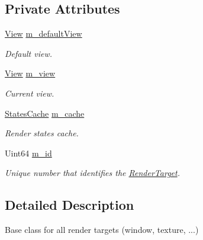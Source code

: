 \subsection*{Private Attributes}
\begin{DoxyCompactItemize}
\item 
\mbox{\label{classsf_1_1_render_target_ada0c3aefe9963dc780ac4fd32287c97e}} 
\mbox{\hyperlink{classsf_1_1_view}{View}} \mbox{\hyperlink{classsf_1_1_render_target_ada0c3aefe9963dc780ac4fd32287c97e}{m\+\_\+default\+View}}
\begin{DoxyCompactList}\small\item\em Default view. \end{DoxyCompactList}\item 
\mbox{\label{classsf_1_1_render_target_a141bf3439a6031b1c767ce1fadb81b53}} 
\mbox{\hyperlink{classsf_1_1_view}{View}} \mbox{\hyperlink{classsf_1_1_render_target_a141bf3439a6031b1c767ce1fadb81b53}{m\+\_\+view}}
\begin{DoxyCompactList}\small\item\em Current view. \end{DoxyCompactList}\item 
\mbox{\label{classsf_1_1_render_target_a56e47f258d99513328806b5a3482c933}} 
\mbox{\hyperlink{structsf_1_1_render_target_1_1_states_cache}{States\+Cache}} \mbox{\hyperlink{classsf_1_1_render_target_a56e47f258d99513328806b5a3482c933}{m\+\_\+cache}}
\begin{DoxyCompactList}\small\item\em Render states cache. \end{DoxyCompactList}\item 
\mbox{\label{classsf_1_1_render_target_a1ac05ada49d916a46b69b0a21eea1c6d}} 
Uint64 \mbox{\hyperlink{classsf_1_1_render_target_a1ac05ada49d916a46b69b0a21eea1c6d}{m\+\_\+id}}
\begin{DoxyCompactList}\small\item\em Unique number that identifies the \mbox{\hyperlink{classsf_1_1_render_target}{Render\+Target}}. \end{DoxyCompactList}\end{DoxyCompactItemize}


\subsection{Detailed Description}
Base class for all render targets (window, texture, ...) 

